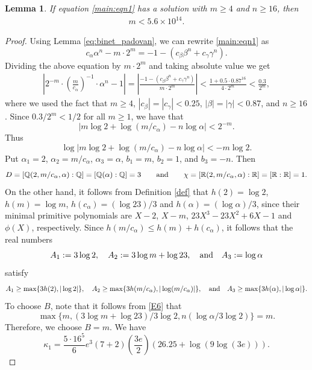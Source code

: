 \documentclass[11pt,a4paper]{article}
\newtheorem{lemma}[theorem]{Lemma}
\numberwithin{equation}{section}
\numberwithin{table}{section}
\numberwithin{figure}{section}
\begin{document}
\begin{lemma}\label{lem:P1}
	If equation \eqref{main:eqn1} has a solution with $m\ge 4$ and $n\ge 16$, then
	\begin{align*}
		m <  5.6\times 10^{14}.
	\end{align*}
\end{lemma}
\begin{proof}
Using Lemma \ref{eq:binet_padovan}, we can rewrite \eqref{main:eqn1} as
$$
c_{\alpha}\alpha^{n}-m\cdot 2^{m}=-1-(c_{\beta}\beta^{n}+c_{\gamma}\gamma^{n}).
$$
Dividing the above equation by $m\cdot 2^{m}$ and taking absolute value we get
\begin{align*}
\left|2^{-m}\cdot \left(\frac{m}{c_{\alpha}}\right)^{-1}\cdot \alpha^{n}-1\right|=\left|\frac{-1-(c_{\beta}\beta^{n}+c_{\gamma}\gamma^{n})}{m\cdot 2^{m}}\right|< \frac{1+0.5\cdot 0.87^{16}}{4\cdot 2^{m}}<\frac{0.3}{2^{m}},
\end{align*}
where we used the fact that $m\ge 4$, $|c_{\beta}|=|c_{\gamma}|<0.25$, $|\beta|=|\gamma|<0.87$, and $n\ge 16$. Since $0.3/2^{m}<1/2$ for all $m\ge 1$, we have that
\begin{equation*}
|m\log 2+\log (m/c_{\alpha})-n\log \alpha |<2^{-m}.
\end{equation*}
Thus
\begin{equation}\label{E5}
\log |m\log 2+\log (m/c_{\alpha})-n\log \alpha|<-m\log 2.
\end{equation}
Put $\alpha_{1}=2$, $\alpha_{2}=m/c_{\alpha}$, $\alpha_{3}=\alpha$, $b_{1}=m$, $b_{2}=1$, and $b_{3}=-n$. Then 
$$
D=[\mathbb{Q}(2,m/c_{\alpha},\alpha):\mathbb{Q}]=[\mathbb{Q}(\alpha):\mathbb{Q}]=3\qquad {\text{\rm  and}}\qquad \chi =[\mathbb{R}(2,m/c_{\alpha},\alpha):\mathbb{R}]=[\mathbb{R}:\mathbb{R}]=1.
$$ 
On the other hand, it follows from Definition \ref{def} that $h(2)=\log 2$, $h(m)=\log m$, $h(c_{\alpha})=(\log 23)/3$ and $h(\alpha)=(\log \alpha)/3$, since their minimal primitive polynomials are $X-2$, $X-m$, $23X^3 - 23X^2 + 6X -1$ and $\phi(X)$, respectively. Since $h(m/c_{\alpha})\le h(m)+h(c_{\alpha})$, it follows that the real numbers 
$$
A_{1}:=3\log 2,\quad A_{2}:=3\log m +\log 23,\quad {\text{\rm and}} \quad A_{3}:=\log \alpha
$$ 
satisfy 
$$
A_{1}\ge \max \{3h(2),|\log 2|\},\quad A_{2}\ge \max \{3h(m/c_{\alpha}),|\log (m/c_{\alpha})|\},\quad {\text{\rm  and}}\quad A_{3}\ge \max \{3h(\alpha),|\log \alpha|\}.
$$
To choose $B$, note that it follows from \eqref{E6} that
$$
\max \{m,(3\log m +\log 23)/3\log 2,n(\log \alpha/3\log 2)\}=m.
$$
Therefore, we choose $B=m$. We have
$$
\kappa_1=\frac{5\cdot 16^{5}}{6}e^{3}(7+2)\left(\frac{3e}{2}\right)\left(26.25+\log (9\log (3e))\right).
$$
\end{proof}
\end{document}

